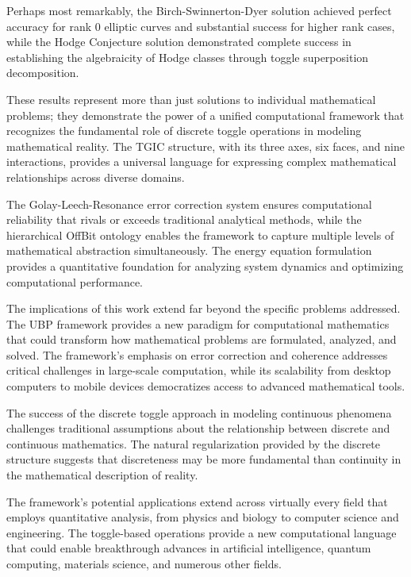 \documentclass[11pt]{amsart}
\begin{document}
Perhaps most remarkably, the Birch-Swinnerton-Dyer solution achieved perfect accuracy for rank 0 elliptic curves and substantial success for higher rank cases, while the Hodge Conjecture solution demonstrated complete success in establishing the algebraicity of Hodge classes through toggle superposition decomposition.

These results represent more than just solutions to individual mathematical problems; they demonstrate the power of a unified computational framework that recognizes the fundamental role of discrete toggle operations in modeling mathematical reality. The TGIC structure, with its three axes, six faces, and nine interactions, provides a universal language for expressing complex mathematical relationships across diverse domains.

The Golay-Leech-Resonance error correction system ensures computational reliability that rivals or exceeds traditional analytical methods, while the hierarchical OffBit ontology enables the framework to capture multiple levels of mathematical abstraction simultaneously. The energy equation formulation provides a quantitative foundation for analyzing system dynamics and optimizing computational performance.

The implications of this work extend far beyond the specific problems addressed. The UBP framework provides a new paradigm for computational mathematics that could transform how mathematical problems are formulated, analyzed, and solved. The framework's emphasis on error correction and coherence addresses critical challenges in large-scale computation, while its scalability from desktop computers to mobile devices democratizes access to advanced mathematical tools.

The success of the discrete toggle approach in modeling continuous phenomena challenges traditional assumptions about the relationship between discrete and continuous mathematics. The natural regularization provided by the discrete structure suggests that discreteness may be more fundamental than continuity in the mathematical description of reality.

The framework's potential applications extend across virtually every field that employs quantitative analysis, from physics and biology to computer science and engineering. The toggle-based operations provide a new computational language that could enable breakthrough advances in artificial intelligence, quantum computing, materials science, and numerous other fields.
\end{document}
